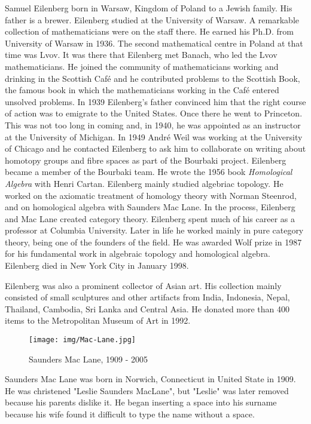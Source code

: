 \documentclass{article}
\begin{document}
Samuel Eilenberg born in Warsaw, Kingdom of Poland to a Jewish family. His father is a brewer. Eilenberg studied at the University of Warsaw. A remarkable collection of mathematicians were on the staff there. He earned his Ph.D. from University of Warsaw in 1936. The second mathematical centre in Poland at that time was Lvov. It was there that Eilenberg met Banach, who led the Lvov mathematicians. He joined the community of mathematicians working and drinking in the Scottish Café and he contributed problems to the Scottish Book, the famous book in which the mathematicians working in the Café entered unsolved problems. In 1939 Eilenberg's father convinced him that the right course of action was to emigrate to the United States. Once there he went to Princeton. This was not too long in coming and, in 1940, he was appointed as an instructor at the University of Michigan. In 1949 André Weil was working at the University of Chicago and he contacted Eilenberg to ask him to collaborate on writing about homotopy groups and fibre spaces as part of the Bourbaki project. Eilenberg became a member of the Bourbaki team. He wrote the 1956 book {\em Homological Algebra} with Henri Cartan. Eilenberg mainly studied algebriac topology. He worked on the axiomatic treatment of homology theory with Norman Steenrod, and on homological algebra with Saunders Mac Lane. In the process, Eilenberg and Mac Lane created category theory. Eilenberg spent much of his career as a professor at Columbia University. Later in life he worked mainly in pure category theory, being one of the founders of the field. He was awarded Wolf prize in 1987 for his fundamental work in algebraic topology and homological algebra. Eilenberg died in New York City in January 1998.

Eilenberg was also a prominent collector of Asian art. His collection mainly consisted of small sculptures and other artifacts from India, Indonesia, Nepal, Thailand, Cambodia, Sri Lanka and Central Asia. He donated more than 400 items to the Metropolitan Museum of Art in 1992\cite{Wiki-Eilenberg}.

\vspace{5mm}

\begin{wrapfigure}{L}{0.35\textwidth}
 \centering
 \texttt{[image: img/Mac-Lane.jpg]}
 \captionsetup{labelformat=empty}
 \caption{Saunders Mac Lane, 1909 - 2005}
 \label{fig:Mac-Lane}
\end{wrapfigure}

Saunders Mac Lane was born in Norwich, Connecticut in United State in 1909. He was christened "Leslie Saunders MacLane", but "Leslie" was later removed because his parents dislike it. He began inserting a space into his surname because his wife found it difficult to type the name without a space.
\end{document}
